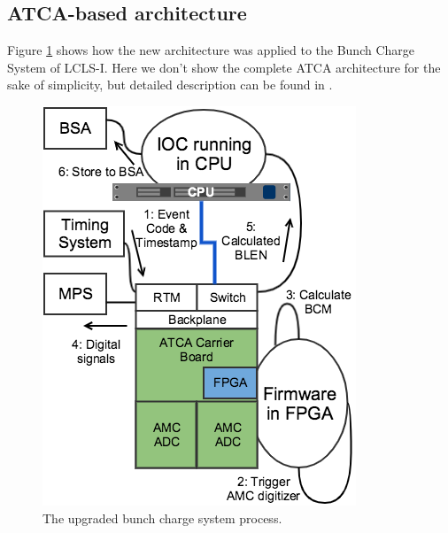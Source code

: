 \documentclass[letter,
               biblatex,     %
               keeplastbox,   %
               ]{jacow}
\begin{document}
\subsection{ATCA-based architecture}
Figure \ref{fig:bcm_atca} shows how the new architecture was applied to the Bunch Charge System of LCLS-I. Here we don't show the complete ATCA architecture for the sake of simplicity, but detailed description can be found in \cite{ryan-2016, atca-bpm-2017}.

\begin{figure}[!htb]
   \centering
   \includegraphics*[width=\columnwidth]{BCM_ATCA_Process}
   \caption{The upgraded bunch charge system process.}
   \label{fig:bcm_atca}
\end{figure}
\end{document}
